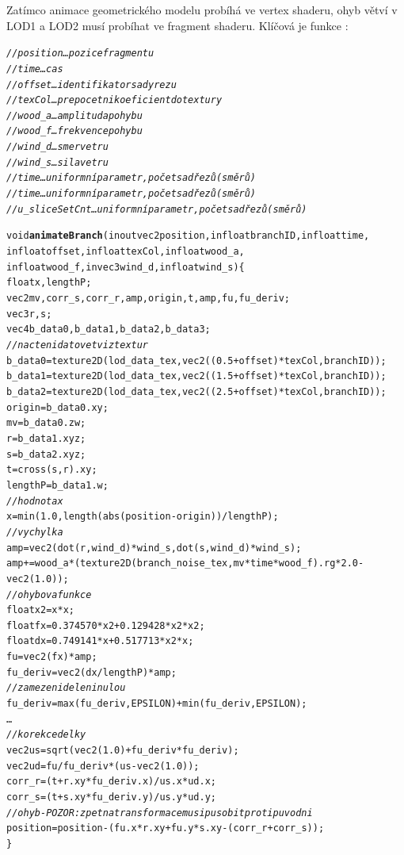 Zatímco animace geometrického modelu probíhá ve vertex shaderu, ohyb větví v LOD1 a LOD2 musí probíhat ve fragment shaderu. Klíčová je funkce :
\begin{alltt}
\textit{// position\dots pozice fragmentu}
\textit{// time\dots cas}
\textit{// offset\dots identifikator sady rezu}
\textit{// texCol\dots prepocetni koeficient do textury}
\textit{// wood_a\dots amplituda pohybu }
\textit{// wood_f\dots frekvence pohybu }
\textit{// wind_d\dots smer vetru }
\textit{// wind_s\dots sila vetru }
\textit{// time\dots uniformní parametr, počet sad řezů (směrů) }
\textit{// time\dots uniformní parametr, počet sad řezů (směrů) }
\textit{// u_sliceSetCnt\dots uniformní parametr, počet sad řezů (směrů) }

void {\bf animateBranch}(inout vec2 position, in float branchID, in float time,
                      in float offset, in float texCol, in float wood_a,
                      in float wood_f, in vec3 wind_d, in float wind_s)\{
    float x, lengthP;
    vec2 mv, corr_s, corr_r, amp, origin, t, amp, fu, fu_deriv;
    vec3 r, s;
    vec4 b_data0, b_data1, b_data2, b_data3;
\textit{// nacteni dat o vetvi z textur }
    b_data0 = texture2D(lod_data_tex, vec2((0.5+offset)*texCol, branchID));
    b_data1 = texture2D(lod_data_tex, vec2((1.5+offset)*texCol, branchID));
    b_data2 = texture2D(lod_data_tex, vec2((2.5+offset)*texCol, branchID));
    origin = b_data0.xy;
    mv = b_data0.zw;
    r = b_data1.xyz;
    s = b_data2.xyz;
    t = cross(s,r).xy;
    lengthP = b_data1.w;
\textit{// hodnota x}		
    x = min(1.0, length(abs(position-origin))/lengthP);
\textit{// vychylka}	
    amp = vec2(dot(r, wind_d) * wind_s, dot(s, wind_d) * wind_s);
    amp += wood_a * ( texture2D( branch_noise_tex , mv * time * wood_f).rg  * 2.0 - vec2(1.0) );
\textit{// ohybova funkce}	
    float x2 = x * x;
    float fx = 0.374570*x2 + 0.129428*x2*x2;
    float dx = 0.749141*x + 0.517713*x2*x;
    fu = vec2(fx) * amp;
    fu_deriv = vec2( dx / lengthP ) * amp;
\textit{// zamezeni deleni nulou}	
    fu_deriv = max(fu_deriv, EPSILON) + min(fu_deriv, EPSILON);
\dots
\pagebreak
\textit{// korekce delky}
    vec2 us = sqrt( vec2(1.0) + fu_deriv * fu_deriv );
    vec2 ud = fu / fu_deriv * ( us - vec2(1.0) );
    corr_r = ( t + r.xy * fu_deriv.x ) / us.x * ud.x;
    corr_s = ( t + s.xy * fu_deriv.y ) / us.y * ud.y;
\textit{// ohyb - POZOR: zpetna transformace musi pusobit proti puvodni}
    position = position - ( fu.x * r.xy + fu.y * s.xy - ( corr_r + corr_s ) );
\}
\end{alltt}

